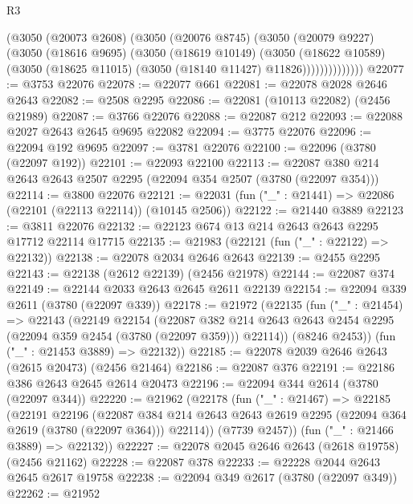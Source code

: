 \begin{lexlean}{R3}
\begin{coremodule}
                (@3050
                  (@20073 @2608)
                  (@3050
                    (@20076 @8745)
                    (@3050
                      (@20079 @9227)
                      (@3050
                        (@18616 @9695)
                        (@3050
                          (@18619 @10149)
                          (@3050
                            (@18622 @10589)
                            (@3050 (@18625 @11015) (@3050 (@18140 @11427) @11826))))))))))))))
@22077 := @3753 @22076
@22078 := @22077 @661
@22081 := @22078 @2028 @2646 @2643
@22082 := @2508 @2295
@22086 := @22081 (@10113 @22082) (@2456 @21989)
@22087 := @3766 @22076
@22088 := @22087 @212
@22093 := @22088 @2027 @2643 @2645 @9695 @22082
@22094 := @3775 @22076
@22096 := @22094 @192 @9695
@22097 := @3781 @22076
@22100 := @22096 (@3780 (@22097 @192))
@22101 := @22093 @22100
@22113 := @22087 @380 @214 @2643 @2643 @2507 @2295 (@22094 @354 @2507 (@3780 (@22097 @354)))
@22114 := @3800 @22076
@22121 := @22031 (fun ("_" : @21441) => @22086 (@22101 (@22113 @22114)) (@10145 @2506))
@22122 := @21440 @3889
@22123 := @3811 @22076
@22132 := @22123 @674 @13 @214 @2643 @2643 @2295 @17712 @22114 @17715
@22135 := @21983 (@22121 (fun ("_" : @22122) => @22132))
@22138 := @22078 @2034 @2646 @2643
@22139 := @2455 @2295
@22143 := @22138 (@2612 @22139) (@2456 @21978)
@22144 := @22087 @374
@22149 := @22144 @2033 @2643 @2645 @2611 @22139
@22154 := @22094 @339 @2611 (@3780 (@22097 @339))
@22178 := @21972
    (@22135
      (fun ("_" : @21454) =>
      @22143
        (@22149
          @22154
          (@22087
            @382
            @214
            @2643
            @2643
            @2454
            @2295
            (@22094 @359 @2454 (@3780 (@22097 @359)))
            @22114))
        (@8246 @2453))
      (fun ("_" : @21453 @3889) => @22132))
@22185 := @22078 @2039 @2646 @2643 (@2615 @20473) (@2456 @21464)
@22186 := @22087 @376
@22191 := @22186 @386 @2643 @2645 @2614 @20473
@22196 := @22094 @344 @2614 (@3780 (@22097 @344))
@22220 := @21962
    (@22178
      (fun ("_" : @21467) =>
      @22185
        (@22191
          @22196
          (@22087
            @384
            @214
            @2643
            @2643
            @2619
            @2295
            (@22094 @364 @2619 (@3780 (@22097 @364)))
            @22114))
        (@7739 @2457))
      (fun ("_" : @21466 @3889) => @22132))
@22227 := @22078 @2045 @2646 @2643 (@2618 @19758) (@2456 @21162)
@22228 := @22087 @378
@22233 := @22228 @2044 @2643 @2645 @2617 @19758
@22238 := @22094 @349 @2617 (@3780 (@22097 @349))
@22262 := @21952

\end{coremodule}
\end{lexlean}
